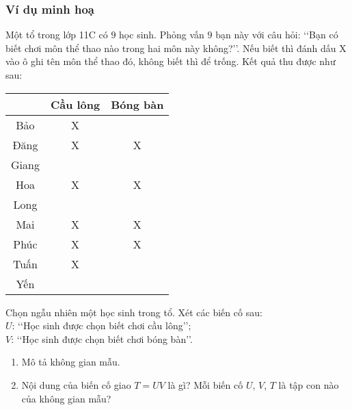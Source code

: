 \subsubsection{Ví dụ minh hoạ}
\begin{vd}%
	Một tổ trong lớp 11C có $9$ học sinh. Phỏng vấn $9$ bạn này với câu hỏi: \lq\lq  Bạn có biết chơi môn thể thao nào trong hai môn này không?\rq\rq. Nếu biết thì đánh dấu X vào ô ghi tên môn thể thao đó, không biết thì để trống. Kết quả thu được như sau:
	\begin{center}
		\begin{tabular}{|c|c|c|}
			\hline
			\diagbox{Tên học sinh}{Môn thể thao} & Cầu lông & Bóng bàn \\
			\hline
			Bảo & X & \\
			\hline
			Đăng & X & X \\
			\hline
			Giang & & \\
			\hline
			Hoa & X & X \\
			\hline
			Long & & \\
			\hline
			Mai & X & X \\
			\hline
			Phúc & X & X \\
			\hline
			Tuấn & X & \\
			\hline
			Yến & & \\
			\hline
		\end{tabular}
	\end{center}
	Chọn ngẫu nhiên một học sinh trong tổ. Xét các biến cố sau:\\	
	$U$: \lq\lq  Học sinh được chọn biết chơi cầu lông\rq\rq;\\
	$V$: \lq\lq  Học sinh được chọn biết chơi bóng bàn\rq\rq.
	\begin{enumerate}
		\item Mô tả không gian mẫu.
		\item Nội dung của biến cố giao $T=U V$ là gì? Mỗi biến cố $U$, $V$, $T$ là tập con nào của không gian mẫu?
	\end{enumerate}
\end{vd}
